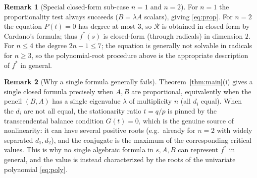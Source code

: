 \documentclass{amsart}
\theoremstyle{definition}
\newtheorem{remark}{Remark}
\begin{document}
\begin{remark}[Special closed-form sub-case $n=1$ and $n=2$]
For $n=1$ the proportionality test always succeeds ($B=\lambda A$ scalars), giving \eqref{eq:prop}. For $n=2$ the equation $P(t)=0$ has degree at most $3$, so $\mathcal R$ is obtained in closed form by Cardano's formula; thus $f^*(s)$ is closed-form (through radicals) in dimension $2$. For $n\le 4$ the degree $2n-1\le 7$; the equation is generally not solvable in radicals for $n\ge3$, so the polynomial-root procedure above is the appropriate description of $f^*$ in general.
\end{remark}

\begin{remark}[Why a single formula generally fails]
Theorem~\ref{thm:main}(i) gives a single closed formula precisely when $A,B$ are proportional, equivalently when the pencil $(B,A)$ has a single eigenvalue $\lambda$ of multiplicity $n$ (all $d_i$ equal). When the $d_i$ are not all equal, the stationarity ratio $t=q/p$ is pinned by the transcendental balance condition $G(t)=0$, which is the genuine source of nonlinearity: it can have several positive roots (e.g.\ already for $n=2$ with widely separated $d_1,d_2$), and the conjugate is the maximum of the corresponding critical values. This is why no single algebraic formula in $s,A,B$ can represent $f^*$ in general, and the value is instead characterized by the roots of the univariate polynomial \eqref{eq:poly}.
\end{remark}
\end{document}
